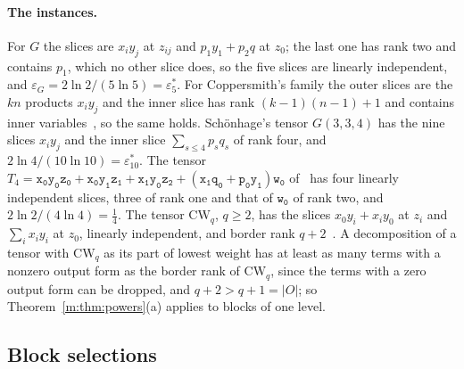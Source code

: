 \documentclass[11pt]{article}
\theoremstyle{definition}
\theoremstyle{remark}
\newcommand{\es}{\varepsilon^*_5}
\newcommand{\et}{\varepsilon^*_{10}}
\newcommand{\tl}[1]{\mathtt{#1}}
\begin{document}
\paragraph{The instances.} For $G$ the slices are $x_iy_j$ at $z_{ij}$ and $p_1y_1+p_2q$ at $z_0$; the last one has rank two and contains $p_1$, which no other slice does, so the five slices are linearly independent, and $\varepsilon_G=2\ln2/(5\ln5)=\es$. For Coppersmith's family the outer slices are the $kn$ products $x_iy_j$ and the inner slice has rank $(k-1)(n-1)+1$ and contains inner variables~\cite[p.~469]{Cop82}, so the same holds. Schönhage's tensor $G(3,3,4)$ has the nine slices $x_iy_j$ and the inner slice $\sum_{s\le4}p_sq_s$ of rank four, and $2\ln4/(10\ln10)=\et$. The tensor $T_4=\tl{x_0y_0z_0}+\tl{x_0y_1z_1}+\tl{x_1y_0z_2}+(\tl{x_1q_0}+\tl{p_0y_1})\tl{w_0}$ of~\cite{Maj26b} has four linearly independent slices, three of rank one and that of $\tl{w_0}$ of rank two, and $2\ln2/(4\ln4)=\frac14$. The tensor $\mathrm{CW}_q$, $q\ge2$, has the slices $x_0y_i+x_iy_0$ at $z_i$ and $\sum_ix_iy_i$ at $z_0$, linearly independent, and border rank $q+2$~\cite{CW90}. A decomposition of a tensor with $\mathrm{CW}_q$ as its part of lowest weight has at least as many terms with a nonzero output form as the border rank of $\mathrm{CW}_q$, since the terms with a zero output form can be dropped, and $q+2>q+1=|O|$; so Theorem~\ref{m:thm:powers}(a) applies to blocks of one level.

\subsection{Block selections}\label{a:sec:blocksel}
\end{document}
